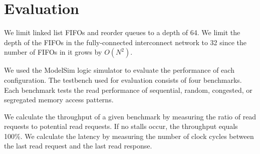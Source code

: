 \section{Evaluation}
\label{sec:evaluation}
    We limit linked list FIFOs and reorder queues to a depth of 64. We limit the depth of the FIFOs in the fully-connected interconnect network to 32 since the number of FIFOs in it grows by $O(N^2)$.

    We used the ModelSim logic simulator to evaluate the performance of each configuration. The testbench used for evaluation consists of four benchmarks. Each benchmark tests the read performance of sequential, random, congested, or segregated memory access patterns.

    We calculate the throughput of a given benchmark by measuring the ratio of read requests to potential read requests. If no stalls occur, the throughput equals 100\%. We calculate the latency by measuring the number of clock cycles between the last read request and the last read response. 
